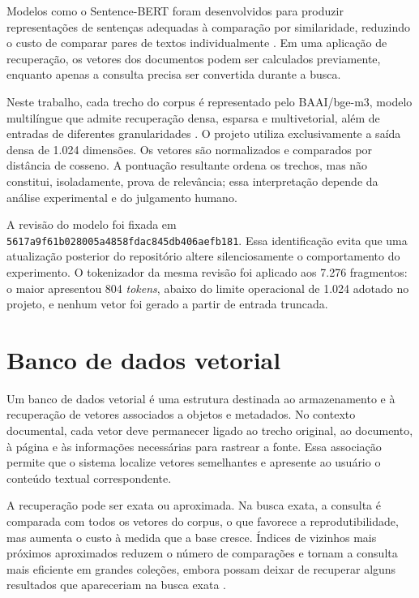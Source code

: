 Modelos como o Sentence-BERT foram desenvolvidos para produzir representações de sentenças adequadas à comparação por similaridade, reduzindo o custo de comparar pares de textos individualmente \cite{reimers2019sbert}. Em uma aplicação de recuperação, os vetores dos documentos podem ser calculados previamente, enquanto apenas a consulta precisa ser convertida durante a busca.

Neste trabalho, cada trecho do corpus é representado pelo BAAI/bge-m3, modelo multilíngue que admite recuperação densa, esparsa e multivetorial, além de entradas de diferentes granularidades \cite{chen2024bgem3}. O projeto utiliza exclusivamente a saída densa de 1.024 dimensões. Os vetores são normalizados e comparados por distância de cosseno. A pontuação resultante ordena os trechos, mas não constitui, isoladamente, prova de relevância; essa interpretação depende da análise experimental e do julgamento humano.

A revisão do modelo foi fixada em \texttt{5617a9f6\allowbreak 1b028005\allowbreak a4858fda\allowbreak c845db40\allowbreak 6aefb181}. Essa identificação evita que uma atualização posterior do repositório altere silenciosamente o comportamento do experimento. O tokenizador da mesma revisão foi aplicado aos 7.276 fragmentos: o maior apresentou 804 \textit{tokens}, abaixo do limite operacional de 1.024 adotado no projeto, e nenhum vetor foi gerado a partir de entrada truncada.

\section{Banco de dados vetorial}

Um banco de dados vetorial é uma estrutura destinada ao armazenamento e à recuperação de vetores associados a objetos e metadados. No contexto documental, cada vetor deve permanecer ligado ao trecho original, ao documento, à página e às informações necessárias para rastrear a fonte. Essa associação permite que o sistema localize vetores semelhantes e apresente ao usuário o conteúdo textual correspondente.

A recuperação pode ser exata ou aproximada. Na busca exata, a consulta é comparada com todos os vetores do corpus, o que favorece a reprodutibilidade, mas aumenta o custo à medida que a base cresce. Índices de vizinhos mais próximos aproximados reduzem o número de comparações e tornam a consulta mais eficiente em grandes coleções, embora possam deixar de recuperar alguns resultados que apareceriam na busca exata \cite{gao2024survey}.

